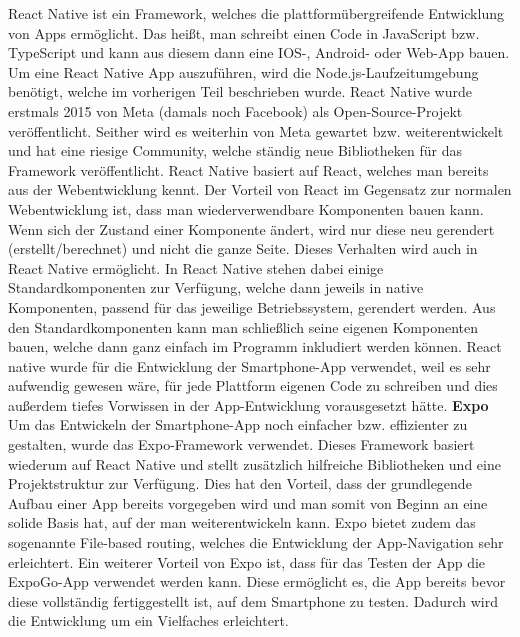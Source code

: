 \documentclass[11pt, twoside]{article}
\begin{document}
React Native ist ein Framework, welches die plattformübergreifende Entwicklung von Apps ermöglicht. Das heißt, man schreibt einen Code in JavaScript bzw. TypeScript und kann aus diesem dann eine IOS-, Android- oder Web-App bauen. Um eine React Native App auszuführen, wird die Node.js-Laufzeitumgebung benötigt, welche im vorherigen Teil beschrieben wurde. React Native wurde erstmals 2015 von Meta (damals noch Facebook) als Open-Source-Projekt veröffentlicht. Seither wird es weiterhin von Meta gewartet bzw. weiterentwickelt und hat eine riesige Community, welche ständig neue Bibliotheken für das Framework veröffentlicht. React Native basiert auf React, welches man bereits aus der Webentwicklung kennt. Der Vorteil von React im Gegensatz zur normalen Webentwicklung ist, dass man wiederverwendbare Komponenten bauen kann. Wenn sich der Zustand einer Komponente ändert, wird nur diese neu gerendert (erstellt/berechnet) und nicht die ganze Seite. Dieses Verhalten wird auch in React Native ermöglicht. In React Native stehen dabei einige Standardkomponenten zur Verfügung, welche dann jeweils in native Komponenten, passend für das jeweilige Betriebssystem, gerendert werden. Aus den Standardkomponenten kann man schließlich seine eigenen Komponenten bauen, welche dann ganz einfach im Programm inkludiert werden können.
React native wurde für die Entwicklung der Smartphone-App verwendet, weil es sehr aufwendig gewesen wäre, für jede Plattform eigenen Code zu schreiben und dies außerdem tiefes Vorwissen in der App-Entwicklung vorausgesetzt hätte. \parencite[vgl.][]{noauthor_urlpi07_nodate}
\vspace{4mm}\newline
\textbf{Expo} \\
Um das Entwickeln der Smartphone-App noch einfacher bzw. effizienter zu gestalten, wurde das Expo-Framework verwendet. Dieses Framework basiert wiederum auf React Native und stellt zusätzlich hilfreiche Bibliotheken und eine Projektstruktur zur Verfügung. Dies hat den Vorteil, dass der grundlegende Aufbau einer App bereits vorgegeben wird und man somit von Beginn an eine solide Basis hat, auf der man weiterentwickeln kann. Expo bietet zudem das sogenannte \glqq File-based routing\grqq{}, welches die Entwicklung der App-Navigation sehr erleichtert. Ein weiterer Vorteil von Expo ist, dass für das Testen der App die \glqq ExpoGo\grqq{}-App verwendet werden kann. Diese ermöglicht es, die App bereits bevor diese vollständig fertiggestellt ist, auf dem Smartphone zu testen. Dadurch wird die Entwicklung um ein Vielfaches erleichtert. \parencite[vgl.][]{noauthor_urlpi08_nodate}
\end{document}
